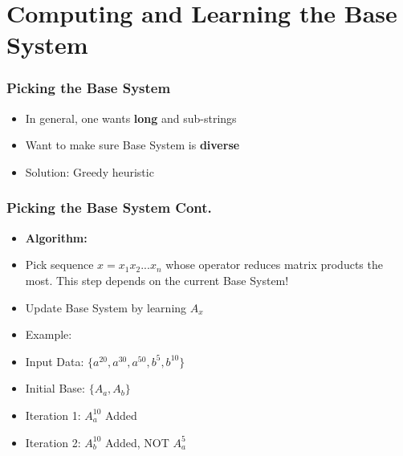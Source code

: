 \documentclass{beamer}
\begin{document}


\section{Computing and Learning the Base System}

\begin{frame}
\frametitle{Picking the Base System}
\begin{itemize}

\item In general, one wants \textbf{long} and  sub-strings 

\item Want to make sure Base System is \textbf{diverse}

\item Solution: Greedy heuristic 


\end{itemize}
\end{frame}


\begin{frame}
\frametitle{Picking the Base System Cont.}
\begin{itemize}

\item \textbf{Algorithm:}

\item Pick sequence $x=x_1x_2...x_n$ whose operator reduces matrix products the most. This step depends on the current Base System!

\item Update Base System by learning $A_x$

\item Example: 
\item Input Data: $\{a^20,a^30,a^50,b^5,b^10\}$
	  
\item Initial Base: $\{A_a, A_b\}$
\item Iteration 1: $ A_a^10$ Added
\item Iteration 2: $ A_b^10$ Added, NOT $A_a^5$

\end{itemize}
\end{frame}

\end{document}
